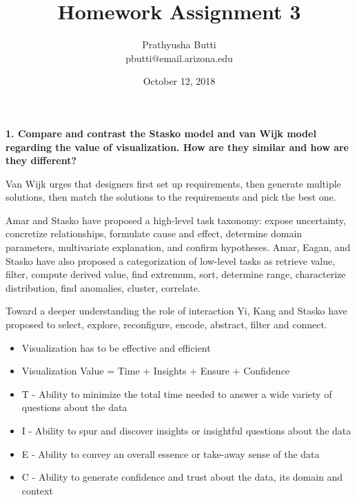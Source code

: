 \documentclass{article}[12pt]
\begin{document}
\title{Homework Assignment 3 \\
	}
\date{October 12, 2018}

\author{
   Prathyusha Butti \\
   pbutti@email.arizona.edu
}

\maketitle

\noindent
{\bf 1. Compare and contrast the Stasko model and van Wijk model regarding the value of visualization. How are they similar and how are they different? }

{

	Van Wijk urges that designers first set up requirements, then generate multiple solutions, then match the
	solutions to the requirements and pick the best one.

	Amar and Stasko have proposed a high-level task taxonomy: expose uncertainty, concretize relationships, formulate
	cause and effect, determine domain parameters, multivariate explanation, and confirm hypotheses. Amar, Eagan, and Stasko have also proposed a categorization of low-level tasks as retrieve value, filter, compute derived value, find extremum, sort, determine range, characterize distribution, find anomalies, cluster, correlate.

	Toward a deeper understanding the role  of interaction Yi, Kang and Stasko have proposed to select, explore, reconfigure, encode, abstract, filter and connect.


    \begin{itemize}
	\item Visualization has to be effective and efficient
	\item Visualization Value = Time + Insights + Ensure + Confidence
	\item T - Ability to minimize the total time needed to
	answer a wide variety of questions about the data
	\item I - Ability to spur and discover insights or
	insightful questions about the data

	\item E - Ability to convey an overall essence
	or take-away sense of the data

	\item C - Ability to generate confidence and trust
	about the data, its domain and context

	\end{itemize}
}
\end{document}
